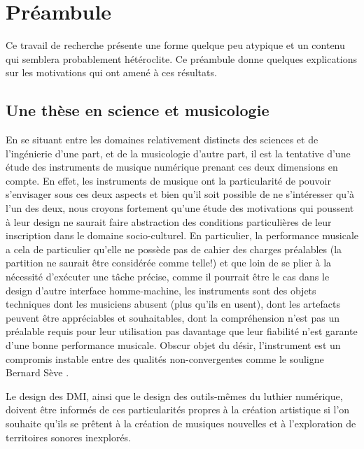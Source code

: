 %
\chapter{Préambule}
\label{ch:preamble}


Ce travail de recherche présente une forme quelque peu atypique et un contenu qui semblera probablement hétéroclite. Ce préambule donne quelques explications sur les motivations qui ont amené à ces résultats.

\section{Une thèse en science et musicologie}

En se situant entre les domaines relativement distincts des sciences et de l'ingénierie d'une part, et de la musicologie d'autre part, il est la tentative d'une étude des instruments de musique numérique prenant ces deux dimensions en compte. En effet, les instruments de musique ont la particularité de pouvoir s'envisager sous ces deux aspects et bien qu'il soit possible de ne s'intéresser qu'à l'un des deux, nous croyons fortement qu'une étude des motivations qui poussent à leur design ne saurait faire abstraction des conditions particulières de leur inscription dans le domaine socio-culturel.
En particulier, la performance musicale a cela de particulier qu'elle ne possède pas de cahier des charges préalables (la partition ne saurait être considérée comme telle!) et que loin de se plier à la nécessité d'exécuter une tâche précise, comme il pourrait être le cas dans le design d'autre interface homme-machine, les instruments sont des objets techniques dont les musiciens abusent (plus qu'ils en usent), dont les artefacts peuvent être appréciables et souhaitables, dont la compréhension n'est pas un préalable requis pour leur utilisation pas davantage que leur fiabilité n'est garante d'une bonne performance musicale. 
Obscur objet du désir, l'instrument est un compromis instable entre des qualités non-convergentes comme le souligne Bernard Sève \cite{seve2013a}.

Le design des DMI, ainsi que le design des outils-mêmes du luthier numérique, doivent être informés de ces particularités propres à la création artistique si l'on souhaite qu'ils se prêtent à la création de musiques nouvelles et à l'exploration de territoires sonores inexplorés.

